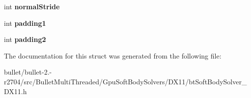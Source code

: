 \begin{DoxyCompactItemize}
\item 
\hypertarget{structbt_soft_body_solver_output_d_xto_d_x_1_1_output_to_vertex_array_c_b_a6607794b25eb77aee9a62b213d517535}{int {\bfseries normal\+Stride}}\label{structbt_soft_body_solver_output_d_xto_d_x_1_1_output_to_vertex_array_c_b_a6607794b25eb77aee9a62b213d517535}

\item 
\hypertarget{structbt_soft_body_solver_output_d_xto_d_x_1_1_output_to_vertex_array_c_b_adc031d6f081c2b0099b0b306973f5030}{int {\bfseries padding1}}\label{structbt_soft_body_solver_output_d_xto_d_x_1_1_output_to_vertex_array_c_b_adc031d6f081c2b0099b0b306973f5030}

\item 
\hypertarget{structbt_soft_body_solver_output_d_xto_d_x_1_1_output_to_vertex_array_c_b_a36101f3091974966cce1996b5bbe6969}{int {\bfseries padding2}}\label{structbt_soft_body_solver_output_d_xto_d_x_1_1_output_to_vertex_array_c_b_a36101f3091974966cce1996b5bbe6969}

\end{DoxyCompactItemize}


The documentation for this struct was generated from the following file\+:\begin{DoxyCompactItemize}
\item 
bullet/bullet-\/2.-\/r2704/src/\+Bullet\+Multi\+Threaded/\+Gpu\+Soft\+Body\+Solvers/\+D\+X11/bt\+Soft\+Body\+Solver\+\_\+\+D\+X11.\+h\end{DoxyCompactItemize}
